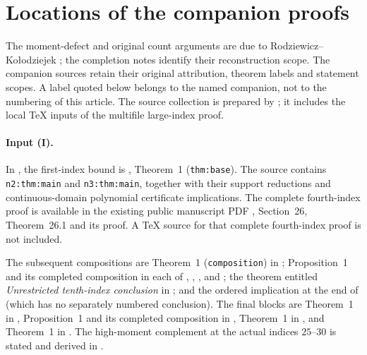 \documentclass[aop,preprint]{imsart}
\theoremstyle{definition}
\numberwithin{equation}{section}
\begin{document}
\section{Locations of the companion proofs}\label{app:companions}

The moment-defect and original count arguments are due to
Rodziewicz--Ko\l{}odziejek \cite{RK2026}; the completion notes identify
their reconstruction scope. The companion sources retain their original
attribution, theorem labels and statement scopes. A label quoted below belongs to the named companion,
not to the numbering of this article. The source collection is prepared
by ; it includes the local TeX
inputs of the multifile large-index proof.

\paragraph{Input (I).}
In , the first-index bound is
, Theorem~1 (\texttt{thm:base}).
The source  contains
\texttt{n2:thm:main} and \texttt{n3:thm:main}, together with their
support reductions and continuous-domain polynomial certificate
implications. The complete fourth-index proof is available in the
existing public manuscript PDF
,
Section~26, Theorem~26.1 and its proof. A TeX source for that complete
fourth-index proof is not included.

The subsequent compositions are Theorem~1
(\texttt{composition}) in ;
Proposition~1 and its completed composition in each of
,
,
, and
;
the theorem entitled \emph{Unrestricted tenth-index conclusion}
in ; and the ordered implication at the end of
(which has no separately numbered conclusion).
The final blocks are Theorem~1 in ,
Proposition~1 and its completed composition in
,
Theorem~1 in , and
Theorem~1 in .
The high-moment complement at the actual indices $25$--$30$
is stated and derived in .
\end{document}
